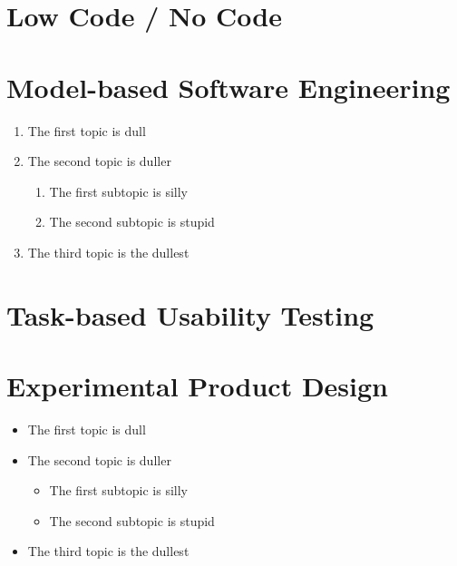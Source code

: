 
\section{Low Code / No Code}
\label{background:section:lowcode}

\section{Model-based Software Engineering}
\label{background:section:mbse}

\begin{enumerate}
\item The first topic is dull
\item The second topic is duller
\begin{enumerate}
\item The first subtopic is silly
\item The second subtopic is stupid
\end{enumerate}
\item The third topic is the dullest
\end{enumerate}

\section{Task-based Usability Testing}
\label{background:section:task}

\section{Experimental Product Design}
\label{background:section:experimentproduct}

\begin{itemize}
\item The first topic is dull
\item The second topic is duller
\begin{itemize}
\item The first subtopic is silly
\item The second subtopic is stupid
\end{itemize}
\item The third topic is the dullest
\end{itemize}

